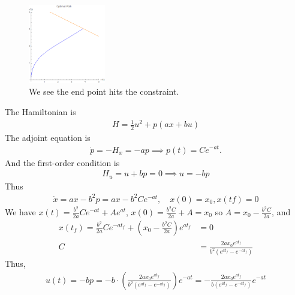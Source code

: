 \documentclass[12pt]{article}
\begin{document}
\begin{problem}[1]
\begin{enumerate}[label=(\alph*)]
\begin{figure}[H]
	\includegraphics[width=0.3\textwidth]{./figures/4.17.png}
	\caption{We see the end point hits the constraint.}
\end{figure}
\end{enumerate}
\end{problem}
\begin{problem}[2]
The Hamiltonian is
\begin{align*}
	H = \frac{1}{2} u^2 + p(ax+bu)
\end{align*}
The adjoint equation is
\begin{align*}
	\dot{p} = -H_x = -ap \implies p(t) = C e^{-at}.
\end{align*}
And the first-order condition is
\begin{align*}
	H_u = u+bp = 0 \implies u=-bp
\end{align*}
Thus
\begin{align*}
	\dot{x} = ax-b^2p = ax - b^2 C e^{-at}, \quad x(0)=x_0,x(tf) = 0
\end{align*}
We have $ x(t) = \frac{b^2}{2a} C e^{-at} + A e^{at}$, $ x(0) = \frac{b^2C}{2a } + A = x_0$ so $ A = x_0 - \frac{b^2C}{ 2a}$, and
\begin{align*}
	x(t_f) = \frac{b^2}{2a} C e^{-at_f} + \left( x_0 - \frac{b^2C}{ 2a} \right) e^{at_f} &= 0 \\
C &=  \frac{2a x_0 e^{at_f}}{b^2(e^{at_f}-e^{-at_f})}
\end{align*}
Thus,
\begin{align*}
	u(t) = -bp = -b \cdot \left( \frac{2a x_0 e^{at_f}}{b^2(e^{at_f}-e^{-at_f})}\right) e^{-at}  = -\frac{2a x_0 e^{at_f}}{b(e^{at_f}-e^{-at_f})} e^{-at}
\end{align*}
\end{problem}
\end{document}
